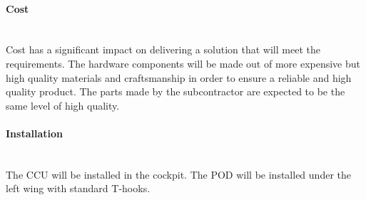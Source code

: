 \paragraph{Cost} \makebox{} \\
Cost has a significant impact on delivering a solution that will meet the requirements. The hardware components will be made out of more expensive but high quality materials and craftsmanship in order to ensure a reliable and high quality product. The parts made by the subcontractor are expected to be the same level of high quality.  

\paragraph{Installation} \makebox{} \\
The CCU will be installed in the cockpit.
The POD will be installed under the left wing with standard T-hooks.